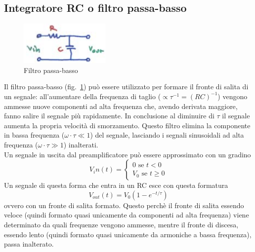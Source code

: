 \subsection{Integratore RC o filtro passa-basso}
\begin{figure}[htbp]
\begin{center}
\includegraphics[scale=1]{./Immagini/FiltroRC.png}
\caption{Filtro passa-basso}
\label{fig:filtroRC}
\end{center}
\end{figure}
Il filtro passa-basso (fig.~\ref{fig:filtroRC}) pu\`o essere utilizzato per formare il fronte di salita di un segnale:
all'aumentare della frequenza di taglio ($\propto \tau^{-1}=(RC)^{-1}$) vengono ammesse nuove componenti ad alta frequenza che, avendo derivata maggiore, fanno salire il segnale pi\`u rapidamente.
In conclusione al diminuire di $\tau$ il segnale aumenta la propria velocit\`a di smorzamento.
Questo filtro elimina la componente in bassa frequenza ($\omega \cdot \tau \ll 1$) del segnale, lasciando i segnali sinusoidali ad alta frequenza ($\omega \cdot \tau \gg 1$) inalterati.\\
Un segnale in uscita dal preamplificatore pu\`o essere approssimato con un gradino
\begin{equation*}
V_in(t) = \begin{cases}
0 \text{ se }t<0\\
V_0 \text{ se }t\ge 0
\end{cases}
\end{equation*}
Un segnale di questa forma che entra in un RC esce con questa formatura
\begin{equation*}
V_{out}(t) = V_0 (1-e^{-t/\tau})
\end{equation*}
ovvero con un fronte di salita formato. 
Questo perch\`e il fronte di salita essendo veloce (quindi formato quasi unicamente da componenti ad alta frequenza) viene determinato da quali frequenze vengono ammesse,
mentre il fronte di discesa, essendo lento (quindi formato quasi unicamente da armoniche a bassa frequenza), passa inalterato.
